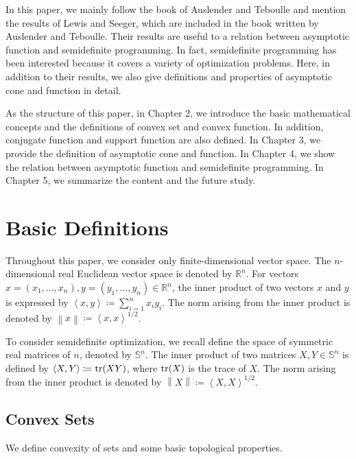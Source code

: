 \documentclass[a4paper,11pt, oneside]{book}
\theoremstyle{definition}
\newcommand{\NDemenstionalRealEuclideanSpace}{\mathbb{R}^n}
\newcommand{\NDemenstionalRealSymmetricMatrixSpace}{\mathbb{S}^n}
\newcommand{\Trace}[1]{\text{\rm tr$({#1})$}} %
\newcommand{\InnerProduct}[2]{\left\langle {#1},{#2}\right\rangle} %
\newcommand{\Norm}[1]{\left\lVert {#1} \right\rVert} %
\begin{document}
In this paper, we mainly follow the book of Auslender and Teboulle and mention the results of Lewis and Seeger, which are included in the book written by Auslender and Teboulle. Their results are useful to a relation between asymptotic function and semidefinite programming. In fact, semidefinite programming has been interested because it covers a variety of optimization problems. Here, in addition to their results, we also give definitions and properties of asymptotic cone and function in detail.

As the structure of this paper, in Chapter 2, we introduce the basic mathematical concepts and the definitions of convex set and convex function. In addition, conjugate function and support function are also defined. In Chapter 3, we provide the definition of asymptotic cone and function. In Chapter 4, we show the relation between asymptotic function and semidefinite programming. In Chapter 5, we summarize the content and the future study.

\chapter{Basic Definitions}

Throughout this paper, we consider only finite-dimensional vector space. The $n$-dimensional real Euclidean vector space is denoted by $\NDemenstionalRealEuclideanSpace$. For vectors $x=(x_1,\dots,x_n), y=(y_1,\dots,y_n) \in \NDemenstionalRealEuclideanSpace$, the inner product of two vectors $x$ and $y$ is expressed by $\InnerProduct{x}{y} \coloneqq \sum_{i = 1}^{n} x_i y_i$. The norm arising from the inner product is denoted by $\Norm{x} \coloneqq \InnerProduct{x}{x} ^{1/2}$.

To consider semidefinite optimization, we recall define the space of symmetric real matrices of $n$, denoted by $\NDemenstionalRealSymmetricMatrixSpace$. The inner product of two matrices $X,Y \in \NDemenstionalRealSymmetricMatrixSpace$ is defined by $\InnerProduct{X}{Y} \coloneqq \Trace{XY}$, where $\Trace{X}$ is the trace of $X$. The norm arising from the inner product is denoted by $\Norm{X} \coloneqq \InnerProduct{X}{X} ^{1/2}$.

\section{Convex Sets}

We define convexity of sets and some basic topological properties.
\end{document}
